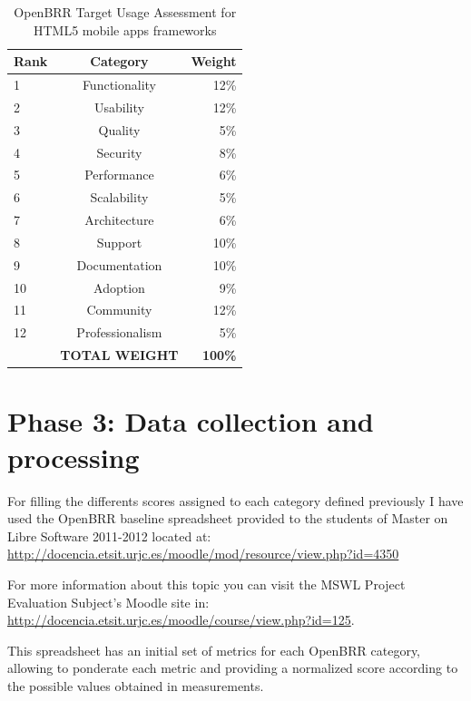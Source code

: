 \documentclass[a4paper,12pt]{book}
\begin{document}
\begin{table}[ht]
\begin{center}
    \begin{tabular}{ | l | c | r |}
    \hline
    \textbf{Rank} & \textbf{Category} & \textbf{Weight} \\ \hline
    1 & Functionality & 12\% \\ \hline
    2 & Usability & 12\% \\ \hline
    3 & Quality & 5\% \\ \hline
    4 & Security & 8\% \\ \hline
    5 & Performance & 6\% \\ \hline
    6 & Scalability & 5\% \\ \hline
    7 & Architecture & 6\% \\ \hline
    8 & Support & 10\% \\ \hline
    9 & Documentation & 10\% \\ \hline
    10 & Adoption & 9\% \\ \hline
    11 & Community & 12\% \\ \hline
    12 & Professionalism & 5\% \\ \hline
     & \textbf{TOTAL WEIGHT} & \textbf{100\%} \\ \hline  
    \end{tabular}
\end{center}
 \caption{OpenBRR Target Usage Assessment for HTML5 mobile apps frameworks}
\label{OpenBRR2}
\end{table}

\section{Phase 3: Data collection and processing}
\label{sec:phase3}
For filling the differents scores assigned to each category defined previously I have used the OpenBRR baseline spreadsheet provided to the students of Master on Libre Software 2011-2012 located at:\\
\url{http://docencia.etsit.urjc.es/moodle/mod/resource/view.php?id=4350}

For more information about this topic you can visit the MSWL Project Evaluation Subject's Moodle site in:\\
\url{http://docencia.etsit.urjc.es/moodle/course/view.php?id=125}. 

This spreadsheet has an initial set of metrics for each OpenBRR category, allowing to ponderate each metric and providing a normalized score according to the possible values obtained in measurements.
\end{document}
